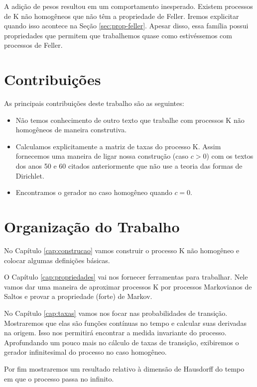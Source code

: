 A adição de pesos resultou em um comportamento inesperado. Existem
processos de K não homogêneos que não têm a propriedade de Feller.
Iremos explicitar quando isso acontece na Seção \ref{sec:prop-feller}.
Apesar disso, essa família possui propriedades que permitem que
trabalhemos quase como estivéssemos com processos de Feller.

\section{Contribuições}
\label{sec:contribucoes}

As principais contribuições deste trabalho são as seguintes:

\begin{itemize}

\item Não temos conhecimento de outro texto que trabalhe com processos
  K não homogêneos de maneira construtiva.

\item Calculamos explicitamente a matriz de taxas do processo K. Assim
  fornecemos uma maneira de ligar nossa construção (caso $c > 0$) com
  os textos dos anos 50 e 60 citados anteriormente que não use a
  teoria das formas de Dirichlet.

\item Encontramos o gerador no caso homogêneo quando $c = 0$.

\end{itemize}

\section{Organização do Trabalho}
\label{sec:organizacao_trabalho}

No Capítulo \ref{cap:construcao} vamos construir o processo K não
homogêneo e colocar algumas definições básicas.

O Capítulo \ref{cap:propriedades} vai nos fornecer ferramentas para
trabalhar. Nele vamos dar uma maneira de aproximar processos K por
processos Markovianos de Saltos e provar a propriedade (forte) de
Markov.

No Capítulo \ref{cap:taxas} vamos nos focar nas probabilidades de
transição. Mostraremos que elas são funções contínuas no tempo e
calcular suas derivadas na origem. Isso nos permitirá encontrar a
medida invariante do processo.  Aprofundando um pouco mais no
cálculo de taxas de transição, exibiremos o gerador infinitesimal do
processo no caso homogêneo.

Por fim mostraremos um resultado relativo à dimensão de Hausdorff do
tempo em que o processo passa no infinito.


